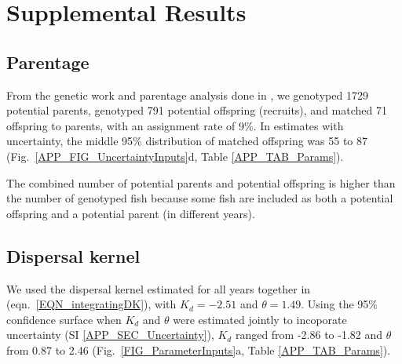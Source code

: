 \documentclass[12pt, oneside]{article}   	%
\begin{document}


\newpage{}

\section{Supplemental Results} \label{APP_SEC_RESULTS} %

\subsection{Parentage} \label{APP_SEC_RESULTS_Parentage}

From the genetic work and parentage analysis done in \cite{catalanoInPrepconnectivity}, we genotyped 1729 potential parents, genotyped 791 potential offspring (recruits), and matched 71 offspring to parents, with an assignment rate of 9\%. In estimates with uncertainty, the middle 95\% distribution of matched offspring was 55 to 87 (Fig.\ \ref{APP_FIG_UncertaintyInputs}d, Table \ref{APP_TAB_Params}).

The combined number of potential parents and potential offspring is higher than the number of genotyped fish because some fish are included as both a potential offspring and a potential parent (in different years).

\subsection{Dispersal kernel} \label{APP_SEC_RESULTS_Dispersal}

We used the dispersal kernel estimated for all years together in \cite{catalanoInPrepconnectivity} (eqn.\ \ref{EQN_integratingDK}), with $K_d = -2.51$ and $\theta = 1.49$. Using the 95\% confidence surface when $K_d$ and $\theta$ were estimated jointly to incoporate uncertainty (SI \ref{APP_SEC_Uncertainty}), $K_d$ ranged from -2.86 to -1.82 and $\theta$ from 0.87 to 2.46 (Fig.\ \ref{FIG_ParameterInputs}a, Table \ref{APP_TAB_Params}).
\end{document}
